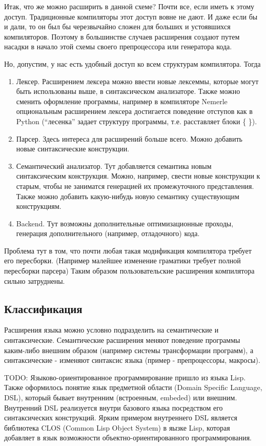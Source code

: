 \documentclass[a4paper,12pt]{article}
\begin{document}
Итак, что же можно расширить в данной схеме? Почти все, если иметь к этому
доступ. Традиционные компиляторы этот доступ вовне не дают. И даже если бы и
дали, то он был бы черезвычайно сложен для больших и устоявшихся компиляторов.
Поэтому в большинстве случаев расширения создают путем насадки в начало этой
схемы своего препроцессора или генератора кода.

Но, допустим, у нас есть удобный доступ ко всем структурам компилятора. Тогда

\begin{enumerate}
  \item Лексер. Расширением лексера можно ввести новые лексеммы, которые могут
  быть использованы выше, в синтаксическом анализаторе. Также можно сменить
  оформление программы, например в компиляторе Nemerle опциональным расширением
  лексера достигается поведение отступов как в Python (``лесенка'' задает
  структуру программы, т.е. расставляет блоки \{ \}).
  \item Парсер. Здесь интереса для расширений больше всего. Можно добавить
  новые синтаксические конструкции.
  \item Семантический анализатор. Тут добавляется семантика новым
  синтаксическим конструкция. Можно, например, свести новые конструкции к
  старым, чтобы не заниматся генерацией их промежуточного представления.
  Также можно добавить какую-нибудь новую семантику существующим конструкциям.
  \item Backend. Тут возможны дополнительные оптимизационные проходы, генерация
  дополнительного (например, отладочного) кода.
\end{enumerate}
Проблема тут в том, что почти любая такая модификация компилятора требует его
пересборки. (Например малейшее изменение граматики требует полной пересборки
парсера) Таким образом пользовательские расширения компилятора сильно
затруднены.

\subsection{Классификация}

Расширения языка можно условно подразделить на семантические и синтаксические.
Семантические расширения меняют поведение программы каким-либо внешним образом
(например системы трансформации программ), а синтаксические - изменяют синтаксис
языка (пример - препроцессоры, макросы).

TODO:
Языково-ориентированное программирование пришло из языка Lisp. 
 Также оформилось понятие язык предметной области (Domain Specific Language, DSL), который бывает 
внутренним (встроенным, embeded) или внешним. Внутренний DSL реализуется внутри базового языка
посредством его синтаксических конструкций. Ярким примером внутреннего DSL является библиотека
CLOS (Common Lisp Object System) в яызке Lisp, которая добавляет в язык
возможности объектно-ориентированного программирования.
\end{document}
